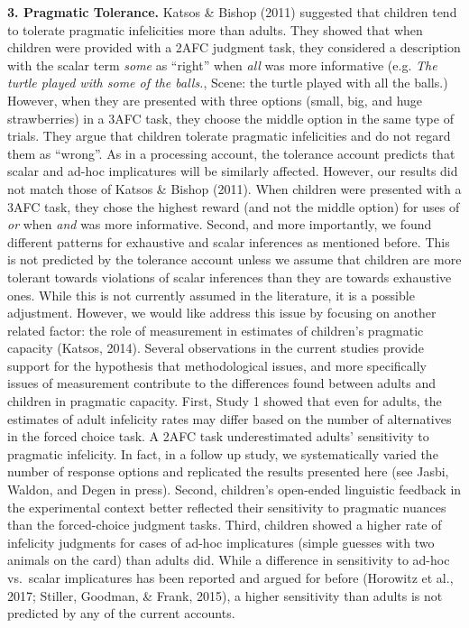 \documentclass[floatsintext,man]{apa6}
\theoremstyle{definition}
\theoremstyle{definition}
\theoremstyle{definition}
\theoremstyle{remark}
\begin{document}
\textbf{3. Pragmatic Tolerance.} Katsos \& Bishop (2011) suggested that
children tend to tolerate pragmatic infelicities more than adults. They
showed that when children were provided with a 2AFC judgment task, they
considered a description with the scalar term \emph{some} as
\enquote{right} when \emph{all} was more informative (e.g. \emph{The
turtle played with some of the balls.}, Scene: the turtle played with
all the balls.) However, when they are presented with three options
(small, big, and huge strawberries) in a 3AFC task, they choose the
middle option in the same type of trials. They argue that children
tolerate pragmatic infelicities and do not regard them as
\enquote{wrong}. As in a processing account, the tolerance account
predicts that scalar and ad-hoc implicatures will be similarly affected.
However, our results did not match those of Katsos \& Bishop (2011).
When children were presented with a 3AFC task, they chose the highest
reward (and not the middle option) for uses of \emph{or} when \emph{and}
was more informative. Second, and more importantly, we found different
patterns for exhaustive and scalar inferences as mentioned before. This
is not predicted by the tolerance account unless we assume that children
are more tolerant towards violations of scalar inferences than they are
towards exhaustive ones. While this is not currently assumed in the
literature, it is a possible adjustment. However, we would like address
this issue by focusing on another related factor: the role of
measurement in estimates of children's pragmatic capacity (Katsos,
2014). Several observations in the current studies provide support for
the hypothesis that methodological issues, and more specifically issues
of measurement contribute to the differences found between adults and
children in pragmatic capacity. First, Study 1 showed that even for
adults, the estimates of adult infelicity rates may differ based on the
number of alternatives in the forced choice task. A 2AFC task
underestimated adults' sensitivity to pragmatic infelicity. In fact, in
a follow up study, we systematically varied the number of response
options and replicated the results presented here (see Jasbi, Waldon,
and Degen in press). Second, children's open-ended linguistic feedback
in the experimental context better reflected their sensitivity to
pragmatic nuances than the forced-choice judgment tasks. Third, children
showed a higher rate of infelicity judgments for cases of ad-hoc
implicatures (simple guesses with two animals on the card) than adults
did. While a difference in sensitivity to ad-hoc vs.~scalar implicatures
has been reported and argued for before (Horowitz et al., 2017; Stiller,
Goodman, \& Frank, 2015), a higher sensitivity than adults is not
predicted by any of the current accounts.
\end{document}
